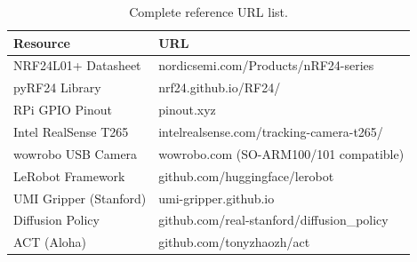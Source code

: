 \documentclass[11pt,a4paper]{article}
\begin{document}
\begin{table}[htbp]
\centering
\begin{tabular}{l l}
\toprule
\textbf{Resource} & \textbf{URL} \\
\midrule
NRF24L01+ Datasheet & nordicsemi.com/Products/nRF24-series \\
pyRF24 Library & nrf24.github.io/RF24/ \\
RPi GPIO Pinout & pinout.xyz \\
Intel RealSense T265 & intelrealsense.com/tracking-camera-t265/ \\
wowrobo USB Camera & wowrobo.com (SO-ARM100/101 compatible) \\
LeRobot Framework & github.com/huggingface/lerobot \\
UMI Gripper (Stanford) & umi-gripper.github.io \\
Diffusion Policy & github.com/real-stanford/diffusion\_policy \\
ACT (Aloha) & github.com/tonyzhaozh/act \\
\bottomrule
\end{tabular}
\caption{Complete reference URL list.}
\label{tab:urls}
\end{table}
\end{document}
